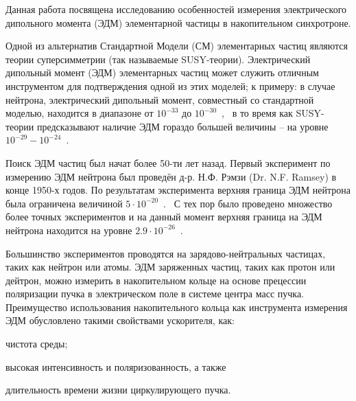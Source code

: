 
{\actuality} 
Данная работа посвящена исследованию особенностей измерения электрического дипольного момента (ЭДМ) 
элементарной частицы в накопительном синхротроне.

Одной из альтернатив Стандартной Модели (СМ) элементарных частиц являются теории суперсимметрии 
(так называемые  SUSY-теории). Электрический дипольный момент (ЭДМ) элементарных частиц может служить
отличным инструментом для подтверждения одной из этих моделей; к примеру: в случае нейтрона, 
электрический дипольный момент, совместный со стандартной моделью, 
находится в диапазоне от $10^{-33}$ до $10^{-30}$~\ecm,~\cite{Harris:Neutron2007} 
в то время как SUSY-теории предсказывают наличие ЭДМ гораздо большей величины -- 
на уровне ${10^{-29} - 10^{-24}}$~\ecm. 

Поиск ЭДМ частиц был начат более 50-ти лет назад. Первый эксперимент по измерению ЭДМ нейтрона был проведён д-р. Н.Ф. Рэмзи (Dr. N.F. Ramsey) в конце 1950-х годов. По результатам эксперимента верхняя граница ЭДМ нейтрона была ограничена величиной ${5\cdot 10^{-20}}$~\ecm.~\cite{Ramsey:Neutron1957} 
С тех пор было проведено множество более точных экспериментов 
и на данный момент верхняя граница на ЭДМ нейтрона находится на уровне 
${2.9\cdot10^{-26}}$~\ecm.~\cite{Baker:nEDM:Main, Baker:nEDM:Reply}

Большинство экспериментов проводятся на зарядово-нейтральных частицах, таких как нейтрон или атомы. 
ЭДМ заряженных частиц, таких как протон или дейтрон, можно измерить в накопительном кольце 
на основе прецессии поляризации пучка в электрическом поле в системе центра масс пучка. 
Преимущество использования накопительного кольца как инструмента измерения ЭДМ 
обусловлено такими свойствами ускорителя, как:
\begin{enumerate*}[(1)]
	\item чистота среды;
	\item высокая интенсивность и поляризованность, а также
	\item длительность времени жизни циркулирующего пучка.~\cite[стр.~9]{BNL:Deuteron2008}
\end{enumerate*}


